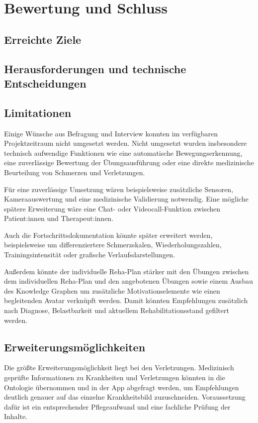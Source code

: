 \section{Bewertung und Schluss}
\subsection{Erreichte Ziele}
\subsection{Herausforderungen und technische Entscheidungen}
\subsection{Limitationen}

Einige Wünsche aus Befragung und Interview konnten im verfügbaren Projektzeitraum nicht umgesetzt werden. Nicht umgesetzt wurden insbesondere technisch aufwendige Funktionen wie eine automatische Bewegungserkennung, eine zuverlässige Bewertung der Übungsausführung oder eine direkte medizinische Beurteilung von Schmerzen und Verletzungen.

Für eine zuverlässige Umsetzung wären beispielsweise zusätzliche Sensoren, Kameraauswertung und eine medizinische Validierung notwendig. Eine mögliche spätere Erweiterung wäre eine Chat- oder Videocall-Funktion zwischen Patient:innen und Therapeut:innen.

Auch die Fortschrittsdokumentation könnte später erweitert werden, beispielsweise um differenziertere Schmerzskalen, Wiederholungszahlen, Trainingsintensität oder grafische Verlaufsdarstellungen.

Außerdem könnte der individuelle Reha-Plan stärker mit den Übungen zwischen dem individuellen Reha-Plan und den angebotenen Übungen sowie einem Ausbau des Knowledge Graphen um zusätzliche Motivationselemente wie einen begleitenden Avatar verknüpft werden. Damit könnten Empfehlungen zusätzlich nach Diagnose, Belastbarkeit und aktuellem Rehabilitationsstand gefiltert werden.

\subsection{Erweiterungsmöglichkeiten}

Die größte Erweiterungsmöglichkeit
liegt bei den Verletzungen. Medizinisch geprüfte Informationen zu Krankheiten
und Verletzungen könnten in die Ontologie übernommen und in der App abgefragt
werden, um Empfehlungen deutlich genauer auf das einzelne Krankheitsbild
zuzuschneiden. Voraussetzung dafür ist ein entsprechender Pflegeaufwand und
eine fachliche Prüfung der Inhalte.

